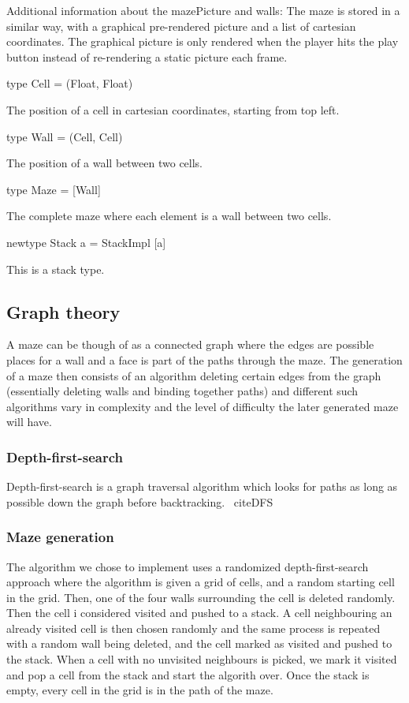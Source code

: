 \documentclass[12pt, a4paper]{article}
\begin{document}
Additional information about the mazePicture and walls:
The maze is stored in a similar way, with a graphical pre-rendered picture and a list of cartesian coordinates. The graphical picture is only rendered when the player hits the play button instead of re-rendering a static picture each frame.

\begin{code}
type Cell = (Float, Float)
\end{code}
The position of a cell in cartesian coordinates, starting from top left.

\begin{code}
type Wall = (Cell, Cell)
\end{code}
The position of a wall between two cells.

\begin{code}
type Maze = [Wall]
\end{code}
The complete maze where each element is a wall between two cells.

\begin{code}
newtype Stack a = StackImpl [a]
\end{code}
This is a stack type.

\subsection{Graph theory}
A maze can be though of as a connected graph where the edges are possible places for a wall and a face is part of the paths through the maze. The generation of a maze then consists of an algorithm deleting certain edges from the graph (essentially deleting walls and binding together paths) and different such algorithms vary in complexity and the level of difficulty the later generated maze will have. 


\subsubsection*{Depth-first-search}
Depth-first-search is a graph traversal algorithm which looks for paths as long as possible down the graph before backtracking. \ cite{DFS}

\subsubsection*{Maze generation}
The algorithm we chose to implement uses a randomized depth-first-search approach where the algorithm is given a grid of cells, and a random starting cell in the grid. Then, one of the four walls surrounding the cell is deleted randomly. Then the cell i considered visited and pushed to a stack. A cell neighbouring an already visited cell is then chosen randomly and the same process is repeated with a random wall being deleted, and the cell marked as visited and pushed to the stack. When a cell with no unvisited neighbours is picked, we mark it visited and pop a cell from the stack and start the algorith over. Once the stack is empty, every cell in the grid is in the path of the maze. 
\end{document}
